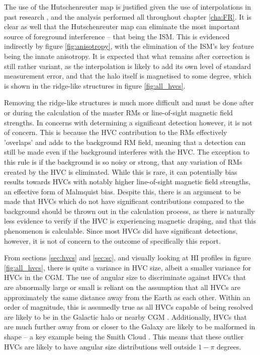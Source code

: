 The use of the Hutschenreuter map is justified given the use of interpolations in past research \citep{ID3, ID5, ID6, ID26, ID73}, and the analysis performed all throughout chapter \ref{cha:FR}. It is clear as well that the Hutschenreuter map can eliminate the most important source of foreground interference – that being the ISM. This is evidenced indirectly by figure \ref{fig:anisotropy}, with the elimination of the ISM's key feature being the innate anisotropy. It is expected that what remains after correction is still rather variant, as the interpolation is likely to add its own level of standard measurement error, and that the halo itself is magnetised to some degree, which is shown in the ridge-like structures in figure \ref{fig:all_hvcs}.


Removing the ridge-like structures is much more difficult and must be done after or during the calculation of the master RMs or line-of-sight magnetic field strengths. In concerns with determining a significant detection however, it is not of concern. This is because the HVC contribution to the RMs effectively 'overlaps' and adds to the background RM field, meaning that a detection can still be made even if the background interferes with the HVC. The exception to this rule is if the background is so noisy or strong, that any variation of RMs created by the HVC is eliminated. While this is rare, it can potentially bias results towards HVCs with notably higher line-of-sight magnetic field strengths, an effective form of Malmquist bias. Despite this, there is an argument to be made that HVCs which do not have significant contributions compared to the background should be thrown out in the calculation process, as there is naturally less evidence to verify if the HVC is experiencing magnetic draping, and that this phenomenon is calculable. Since most HVCs did have significant detections, however, it is not of concern to the outcome of specifically this report.


From sections \ref{sec:hvcs} and \ref{sec:sc}, and visually looking at HI profiles in figure \ref{fig:all_hvcs}, there is quite a variance in HVC size, albeit a smaller variance for HVCs in the CGM. The use of angular size to discriminate against HVCs that are abnormally large or small is reliant on the assumption that all HVCs are approximately the same distance away from the Earth as each other. Within an order of magnitude, this is assumedly true as all HVCs capable of being resolved are likely to be in the Galactic halo or nearby CGM \citep{ID66, ID74}. Additionally, HVCs that are much further away from or closer to the Galaxy are likely to be malformed in shape \citep{ID66} – a key example being the Smith Cloud \citep{ID28, ID64}. This means that these outlier HVCs are likely to have angular size distributions well outside $1-\pi$ degrees.


